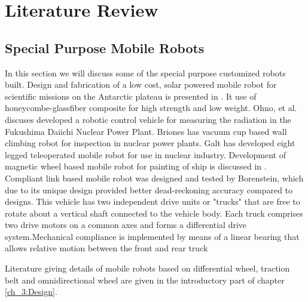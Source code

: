 \setcounter{secnumdepth}{4} 
\chapter{Literature Review}
\label{c2_LitRev}



\section{ Special Purpose Mobile Robots}
In this section we will discuss some of the special purpose customized robots built. Design and fabrication of a low cost, solar powered mobile robot for  scientific missions on the Antarctic plateau is presented in \cite{ray2005design}. It use of honeycombe-glassfiber composite for high strength and low weight. Ohno, et al. \cite{ohno2011robotic} discuses   developed a robotic control vehicle for measuring the radiation in the Fukushima Daiichi Nuclear Power Plant. Briones \cite{briones1994wall} has vacuum cup based wall climbing robot for inspection in  nuclear power plants. Galt \cite{galt1997tele} has developed eight legged teleoperated mobile robot for use in  nuclear industry. Development of magnetic wheel based mobile robot for painting of ship is discussed in \cite{cho2013study}. Compliant link based mobile robot was designed and tested by Borenstein\cite{borenstein1995control}, which due to its unique design provided better dead-reckoning accuracy compared to designs. This vehicle has two independent drive units or "trucks" that are free to rotate about a vertical shaft connected to the vehicle body. Each truck comprises two drive motors on a common axes and forms a differential drive system.Mechanical compliance is implemented
by means of a linear bearing that allows relative motion between the front and rear truck

 Literature giving details of  mobile robots based on   differential wheel, traction belt and omnidirectional wheel are given in the introductory part of chapter \ref{ch_3:Design}.

   

